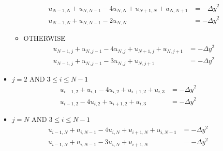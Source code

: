 \documentclass[11pt]{article}
\begin{document}
\begin{itemize}
\begin{itemize}
			\begin{align*}
				u_{N-1,N} + u_{N,N-1} - 4u_{N,N} + u_{N+1,N} + u_{N,N+1} &= -{\Delta y}^2\\
				u_{N-1,N} + u_{N,N-1} - 2u_{N,N} &= -{\Delta y}^2
			\end{align*}
			\item OTHERWISE
			\begin{align*}
				u_{N-1,j} + u_{N,j-1} - 4u_{N,j} + u_{N+1,j} + u_{N,j+1} &= -{\Delta y}^2\\
				u_{N-1,j} + u_{N,j-1} - 3u_{N,j} + u_{N,j+1} &= -{\Delta y}^2
			\end{align*}
		\end{itemize}
		\item $ j = 2 $ AND $ 3\leq i\leq N-1 $
		\begin{align*}
			u_{i-1,2} + u_{i,1} - 4u_{i,2} + u_{i+1,2} + u_{i,3} &= -{\Delta y}^2\\
			u_{i-1,2} - 4u_{i,2} + u_{i+1,2} + u_{i,3} &= -{\Delta y}^2
		\end{align*}
		\item $ j = N $ AND $ 3\leq i\leq N-1 $
		\begin{align*}
			u_{i-1,N} + u_{i,N-1} - 4u_{i,N} + u_{i+1,N} + u_{i,N+1} &= -{\Delta y}^2\\
			u_{i-1,N} + u_{i,N-1} - 3u_{i,N} + u_{i+1,N} &= -{\Delta y}^2
		\end{align*}
	\end{itemize}
\end{document}
